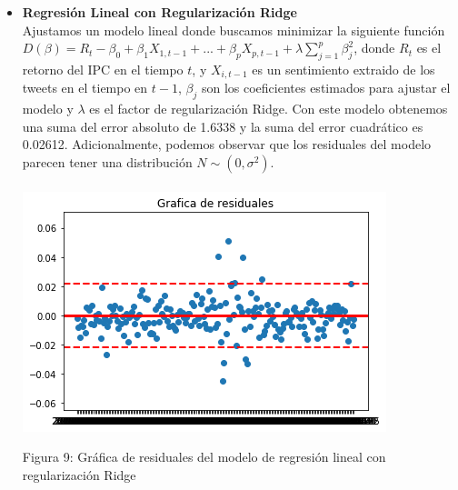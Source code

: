 \documentclass[12pt,reqno,letter]{article}
\newenvironment{fig2}[1][\unskip]{}{} %
\begin{document}
\begin{multicols}{2}
\begin{itemize}
  \item \textbf{Regresión Lineal con Regularización Ridge} \\
  Ajustamos un modelo lineal donde buscamos minimizar la siguiente función $D(\beta)=R_t-\beta_0+\beta_1 X_{1,t-1}+...+\beta_p X_{p,t-1}+\lambda \sum_{j=1}^p \beta_j^2$, donde $R_t$ es el retorno del IPC en el tiempo $t$, y $X_{i,t-1}$ es un sentimiento extraido de los tweets en el tiempo en $t-1$, $\beta_j$  son los coeficientes estimados para ajustar el modelo y $\lambda$ es el factor de regularización Ridge. Con este modelo obtenemos una suma del error absoluto de 1.6338 y la suma del error cuadrático es 0.02612. Adicionalmente, podemos observar que los residuales del modelo parecen tener una distribución $N \sim (0,\sigma ^2).$
  \\\\
 \begin{fig2}\includegraphics[scale=0.5]{img/Residuales_ridge.png}
 \caption{Figura 9: Gráfica de residuales del modelo de regresión lineal con regularización Ridge}\end{fig2}


\end{itemize}
\end{multicols}
\end{document}
